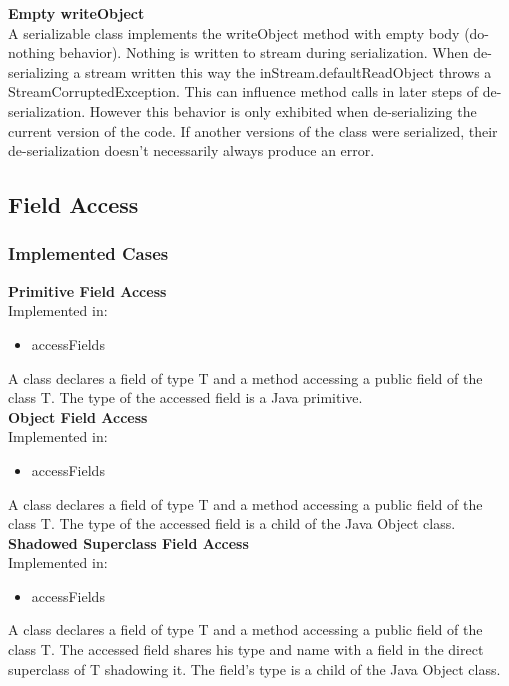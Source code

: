 \documentclass{article}
\begin{document}
\noindent
\textbf{Empty writeObject}\\
A serializable class implements the writeObject method with empty body (do-nothing behavior). Nothing is written to stream during serialization. When de-serializing a stream written this way the inStream.defaultReadObject throws a StreamCorruptedException. This can influence method calls in later steps of de-serialization. However this behavior is only exhibited when de-serializing the current version of the code. If another versions of the class were serialized, their de-serialization doesn't necessarily always produce an error.\\


\subsection{Field Access}
\subsubsection{Implemented Cases}

\textbf{Primitive Field Access}\\
Implemented in: 
\begin{itemize}
    \item accessFields
\end{itemize}
A class declares a field of type T and a method accessing a public field of the class T. The type of the accessed field is a Java primitive.\\

\noindent
\textbf{Object Field Access}\\
Implemented in: 
\begin{itemize}
    \item accessFields
\end{itemize}
A class declares a field of type T and a method accessing a public field of the class T. The type of the accessed field is a child of the Java Object class.\\

\noindent
\textbf{Shadowed Superclass Field Access}\\
Implemented in: 
\begin{itemize}
    \item accessFields
\end{itemize}
A class declares a field of type T and a method accessing a public field of the class T. The accessed field shares his type and name with a field in the direct superclass of T shadowing it. The field's type is a child of the Java Object class.\\
\end{document}
